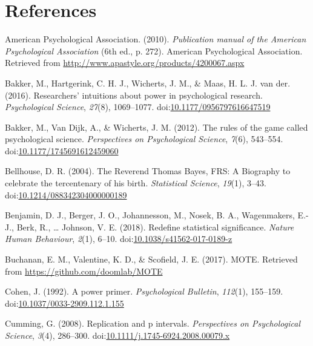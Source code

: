 \documentclass[english,man]{apa6}
\theoremstyle{definition}
\theoremstyle{definition}
\theoremstyle{definition}
\theoremstyle{remark}
\begin{document}
\newpage

\section{References}\label{references}

\setlength{\parindent}{-0.5in} \setlength{\leftskip}{0.5in}

\hypertarget{refs}{}
\hypertarget{ref-AmericanPsychologicalAssociation2010}{}
American Psychological Association. (2010). \emph{Publication manual of
the American Psychological Association} (6th ed., p. 272). American
Psychological Association. Retrieved from
\url{http://www.apastyle.org/products/4200067.aspx}

\hypertarget{ref-Bakker2016}{}
Bakker, M., Hartgerink, C. H. J., Wicherts, J. M., \& Maas, H. L. J. van
der. (2016). Researchers' intuitions about power in psychological
research. \emph{Psychological Science}, \emph{27}(8), 1069--1077.
doi:\href{https://doi.org/10.1177/0956797616647519}{10.1177/0956797616647519}

\hypertarget{ref-Bakker2012}{}
Bakker, M., Van Dijk, A., \& Wicherts, J. M. (2012). The rules of the
game called psychological science. \emph{Perspectives on Psychological
Science}, \emph{7}(6), 543--554.
doi:\href{https://doi.org/10.1177/1745691612459060}{10.1177/1745691612459060}

\hypertarget{ref-Bellhouse2004}{}
Bellhouse, D. R. (2004). The Reverend Thomas Bayes, FRS: A Biography to
celebrate the tercentenary of his birth. \emph{Statistical Science},
\emph{19}(1), 3--43.
doi:\href{https://doi.org/10.1214/088342304000000189}{10.1214/088342304000000189}

\hypertarget{ref-Benjamin2017}{}
Benjamin, D. J., Berger, J. O., Johannesson, M., Nosek, B. A.,
Wagenmakers, E.-J., Berk, R., \ldots{} Johnson, V. E. (2018). Redefine
statistical significance. \emph{Nature Human Behaviour}, \emph{2}(1),
6--10.
doi:\href{https://doi.org/10.1038/s41562-017-0189-z}{10.1038/s41562-017-0189-z}

\hypertarget{ref-Buchanan2017}{}
Buchanan, E. M., Valentine, K. D., \& Scofield, J. E. (2017). MOTE.
Retrieved from \url{https://github.com/doomlab/MOTE}

\hypertarget{ref-Cohen1992a}{}
Cohen, J. (1992). A power primer. \emph{Psychological Bulletin},
\emph{112}(1), 155--159.
doi:\href{https://doi.org/10.1037/0033-2909.112.1.155}{10.1037/0033-2909.112.1.155}

\hypertarget{ref-Cumming2008}{}
Cumming, G. (2008). Replication and p intervals. \emph{Perspectives on
Psychological Science}, \emph{3}(4), 286--300.
doi:\href{https://doi.org/10.1111/j.1745-6924.2008.00079.x}{10.1111/j.1745-6924.2008.00079.x}
\end{document}
